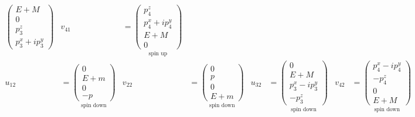 \documentclass[12pt]{article}
\begin{document}
\begin{align*}
{
\begin{pmatrix}E+M\\0\\p_3^z\\p_3^x+ip_3^y\end{pmatrix}
}
&
v_{41}&=
\underset{\text{spin up}}
{
\begin{pmatrix}p_4^z\\p_4^x+ip_4^y\\E+M\\0\end{pmatrix}
}
\\[1ex]
u_{12}&=
\underset{\text{spin down}}
{
\begin{pmatrix}0\\E+m\\0\\-p\end{pmatrix}
}
&
v_{22}&=
\underset{\text{spin down}}
{
\begin{pmatrix}0\\p\\0\\E+m\end{pmatrix}
}
&
u_{32}&=
\underset{\text{spin down}}
{
\begin{pmatrix}0\\E+M\\p_3^x-ip_3^y\\-p_3^z\end{pmatrix}
}
&
v_{42}&=
\underset{\text{spin down}}
{
\begin{pmatrix}p_4^x-ip_4^y\\-p_4^z\\0\\E+M\end{pmatrix}
}
\end{align*}
\else
\end{document}
